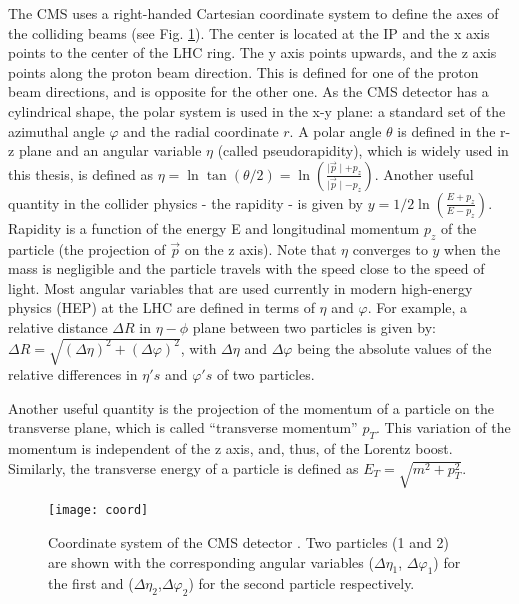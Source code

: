 \begin{normalsize}
The CMS uses a right-handed Cartesian coordinate system to define the axes of the colliding beams (see Fig. \ref{coord}). The center is located at the IP and the x axis points to the center of the LHC ring. The y axis points upwards, and the z axis points along the proton beam direction. This is defined for one of the proton beam directions, and is opposite for the other one. As the CMS detector has a cylindrical shape, the polar system is used in the x-y plane: a standard set of the azimuthal angle $\varphi$ and the radial coordinate $r$. A polar angle $\theta$ is defined in the r-z plane and an angular variable $\eta$ (called pseudorapidity), which is widely used in this thesis, is defined as $\eta = \ln \tan(\theta/2) = \ln (\frac{\mid \vec{p}\mid + p_z}{\mid \vec{p}\mid - p_z})$. Another useful quantity in the collider physics - the rapidity - is given by $y = 1/2 \ln ( \frac{E + p_z}{E - p_z})$. Rapidity is a function of the energy E and longitudinal momentum $p_z$ of the particle (the projection of $\vec{p}$ on the z axis). 
Note that $\eta$ converges to $y$ when the mass is negligible and the particle travels with the speed close to the speed of light. Most angular variables that are used currently in modern high-energy physics (HEP) at the LHC are defined in terms of $\eta$ and $\varphi$. For example, a relative distance $\Delta R$ in $\eta - \phi$ plane between two particles is given by:
$ \Delta R = \sqrt{(\Delta \eta)^2 + (\Delta \varphi)^2}$, with $\Delta \eta$ and $\Delta \varphi$ being the absolute values of the relative differences in $\eta's$ and $\varphi 's$ of two particles. 

Another useful quantity is the projection of the momentum of a particle on the transverse plane, which is called ``transverse momentum'' $p_T$. This variation of the momentum is independent of the z axis, and, thus, of the Lorentz boost.  Similarly, the transverse energy of a particle is defined as $E_T = \sqrt{m^2 + p_T^2 }$. 





\begin{figure}[H]
  \centering
  \texttt{[image: coord]}
  \caption[Coordinate system of the CMS detector]{Coordinate system of the CMS detector \cite{MonroyMontanez:2639240}. Two particles (1 and 2) are shown with the corresponding angular variables ($\Delta \eta_1$, $\Delta \varphi_1$) for the first and ($\Delta \eta_2$,$ \Delta \varphi_2$) for the second particle respectively.}
  \label{coord}
\end{figure}


\end{normalsize}
